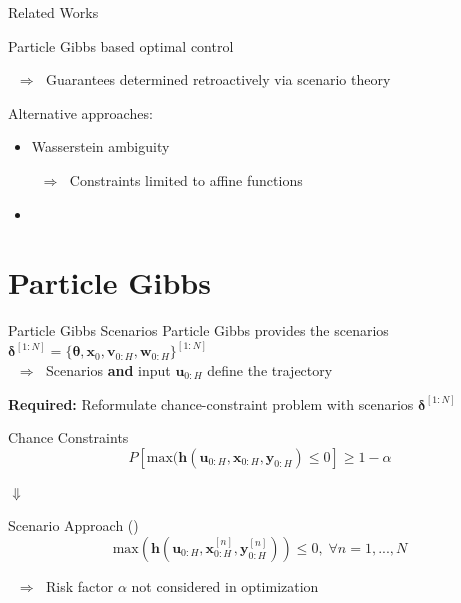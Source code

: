 \documentclass[student, noshadow, itr, english, aspectratio=169]{ITR_LSR_slides}
\begin{document}
\begin{frame}{Related Works}

Particle Gibbs based optimal control \textbf{\cite[4]{Robert_24}}

$\;\; \Rightarrow \;$ Guarantees determined retroactively via scenario theory

\vspace{.4cm}

Alternative approaches:
\begin{itemize}
\item Wasserstein ambiguity \cite[4]{Hota_19}

$\;\; \Rightarrow \;$ Constraints limited to affine functions
\item {} \textbf{\cite[4]{Yassine_22}}\\
\makebox[3cm]{\hfill}   \cite[4]{Adam_22} 
\end{itemize}
\end{frame}


\section{Particle Gibbs}

\begin{frame}{Particle Gibbs Scenarios}
Particle Gibbs provides the scenarios $\boldsymbol{\delta}^{[1:N]} = \{ \boldsymbol{\theta}, \boldsymbol{x}_0, \boldsymbol{v}_{0:H}, \boldsymbol{w}_{0:H}\}^{[1:N]}$\\

$\;\; \Rightarrow \;$ Scenarios \textbf{and} input $\boldsymbol{u}_{0:H}$ define the trajectory

\textbf{Required:} Reformulate chance-constraint problem with scenarios $\boldsymbol{\delta}^{[1:N]}$

\begin{block}{Chance Constraints}
	\begin{equation*}
		P \left[  \text{max}(\boldsymbol{h}(\boldsymbol{u}_{0:H},  \boldsymbol{x}_{0:H},  \boldsymbol{y}_{0:H}) \leq 0 \right] \geq 1 - \alpha
	\end{equation*}
\end{block}	

\makebox[6.7cm]{\hfill} $\boldsymbol{\Downarrow}$ 

\begin{block}{Scenario Approach (\cite{Robert_24})}
	\begin{equation*}
		 \text{max}(\boldsymbol{h}(\boldsymbol{u}_{0:H},  \boldsymbol{x}_{0:H}^{[n]},  \boldsymbol{y}_{0:H}^{[n]})) \leq 0, \; \forall n = 1, ..., N
	\end{equation*}
\end{block}

$\;\; \Rightarrow \;$ Risk factor $\alpha$ not considered in optimization



\end{frame}
\end{document}
